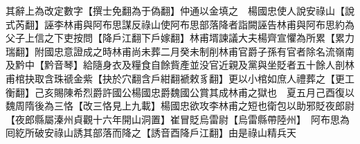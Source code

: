 其辭上為改定數字【撰士免翻為于偽翻】仲通以金填之　楊國忠使人說安祿山【說式芮翻】誣李林甫與阿布思謀反祿山使阿布思部落降者詣闕誣告林甫與阿布思約為父子上信之下吏按問【降戶江翻下戶嫁翻】林甫壻諫議大夫楊齊宣懼為所累【累力瑞翻】附國忠意證成之時林甫尚未葬二月癸未制削林甫官爵子孫有官者除名流嶺南及黔中【黔音琴】給隨身衣及糧食自餘貲產並没官近親及黨與坐貶者五十餘人剖林甫棺抉取含珠禠金紫【抉於穴翻含戶紺翻褫敕豸翻】更以小棺如庶人禮葬之【更工衡翻】己亥賜陳希烈爵許國公楊國忠爵魏國公賞其成林甫之獄也　夏五月己酉復以魏周隋後為三恪【改三恪見上九載】楊國忠欲攻李林甫之短也衛包以助邪貶夜郎尉【夜郎縣屬溱州貞觀十六年開山洞置】崔冒貶烏雷尉【烏雷縣帶陸州】　阿布思為囘紇所破安祿山誘其部落而降之【誘音酉降戶江翻】由是祿山精兵天